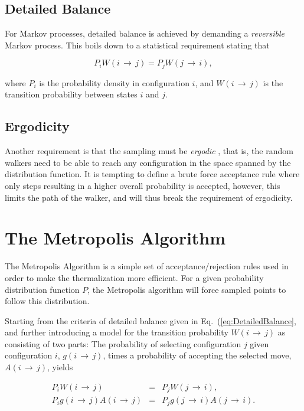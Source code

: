 \subsection{Detailed Balance} 

For Markov processes, detailed balance is achieved by demanding a \textit{reversible} Markov process. This boils down to a statistical requirement stating that 

\begin{equation}
 \label{eq:DetailedBalance}
 P_iW(i\,\rightarrow\,j) = P_jW(j\,\rightarrow\,i),
\end{equation}

where $P_i$ is the probability density in configuration $i$, and $W(i\,\rightarrow\,j)$ is the transition probability between states $i$ and $j$. 

\subsection{Ergodicity}

Another requirement is that the sampling must be \textit{ergodic} \cite{robertcasella}, that is, the random walkers need to be able to reach any configuration in the space spanned by the distribution function. It is tempting to define a brute force acceptance rule where only steps resulting in a higher overall probability is accepted, however, this limits the path of the walker, and will thus break the requirement of ergodicity.

\section{The Metropolis Algorithm}
\label{sec:MetroMain}

The Metropolis Algorithm is a simple set of acceptance/rejection rules used in order to make the thermalization more efficient. For a given probability distribution function $P$, the Metropolis algorithm will force sampled points to follow this distribution. 

Starting from the criteria of detailed balance given in Eq.~(\ref{eq:DetailedBalance}, and further introducing a model for the transition probability $W(i\,\rightarrow\,j)$ as consisting of two parts: The probability of selecting configuration $j$ given configuration $i$, $g(i\,\rightarrow\,j)$, times a probability of accepting the selected move, $A(i\,\rightarrow\,j)$, yields

\begin{eqnarray}
 \label{eq:metro1}
 P_iW(i\,\rightarrow\,j) &=& P_jW(j\,\rightarrow\,i), \nonumber \\
 P_ig(i\,\rightarrow\,j)A(i\,\rightarrow\,j) &=& P_jg(j\,\rightarrow\,i)A(j\,\rightarrow\,i).
\end{eqnarray}

